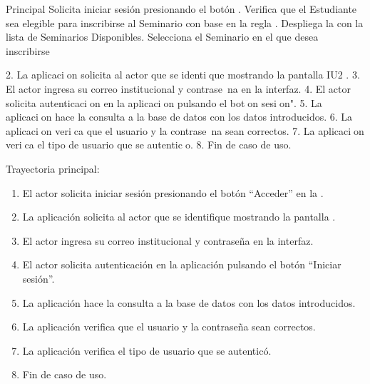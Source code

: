 	\begin{UCtrayectoria}{Principal}
		\UCpaso[\UCactor] Solicita iniciar sesión presionando el botón  \label{CU17Login}.
		\UCpaso Verifica que el Estudiante sea elegible para inscribirse al Seminario con base en la regla  .
		\UCpaso Despliega la  con la lista de Seminarios Disponibles.
		\UCpaso[\UCactor] Selecciona el Seminario en el que desea inscribirse 
		
2. La aplicacion solicita al actor que se identique mostrando la pantalla IU2 .
3. El actor ingresa su correo institucional y contrase~na en la interfaz.
4. El actor solicita autenticacion en la aplicacion pulsando el boton \Iniciar sesion".
5. La aplicacion hace la consulta a la base de datos con los datos introducidos.
6. La aplicacion verica que el usuario y la contrase~na sean correctos.
7. La aplicacion verica el tipo de usuario que se autentico.
8. Fin de caso de uso.	
	
	\item Trayectoria principal:
		\begin{enumerate}
			\item El actor solicita iniciar sesión presionando el botón “Acceder” en la .
			\item La aplicación solicita al actor que se identifique mostrando la pantalla .
			\item El actor ingresa su correo institucional y contraseña en la interfaz.
			\item El actor solicita autenticación en la aplicación pulsando el botón “Iniciar sesión”. 
			\item La aplicación hace la consulta a la base de datos con los datos introducidos.
			\item La aplicación verifica que el usuario y la contraseña sean correctos.
			\item La aplicación verifica el tipo de usuario que se autenticó.
			\item Fin de caso de uso.


\end{enumerate}
\end{UCtrayectoria}
